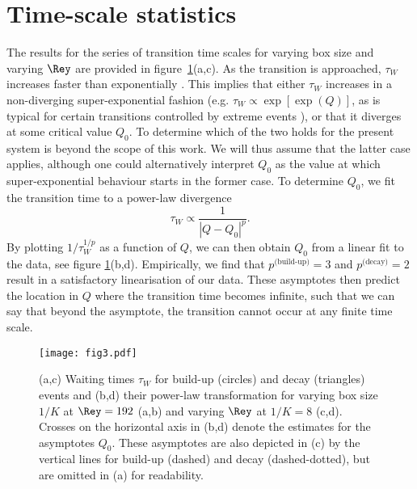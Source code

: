 \documentclass[]{jfm}
\begin{document}
\section{Time-scale statistics}\label{sec:results_discussion}     %
The results for the series of transition time scales for varying box size and varying $\Rey$ are provided in figure~\ref{fig:tauw}(a,c). As the transition is approached, $\tau_W$ increases faster than exponentially \citep[see][]{VanKan2019a}. This implies that either $\tau_W$ increases in a non-diverging super-exponential fashion (e.g. $\tau_W\propto \exp[\exp(Q)]$, as is typical for certain transitions controlled by extreme events \citep{Goldenfeld2010,Nemoto2018,Nemoto2021,Gome2021}), or that it diverges at some critical value $Q_0$. To determine which of the two holds for the present system is beyond the scope of this work. We will thus assume that the latter case applies, although one could alternatively interpret $Q_0$ as the value at which super-exponential behaviour starts in the former case. To determine $Q_0$, we fit the transition time to a power-law divergence
\begin{equation}\label{eq:asymptote}
    \tau_W\propto\frac{1}{\left|Q-Q_0\right|^p}.
\end{equation}
By plotting $1/\tau_W^{1/p}$ as a function of $Q$, we can then obtain $Q_0$ from a linear fit to the data, see figure \ref{fig:tauw}(b,d). Empirically, we find that $p^{\textrm{(build-up)}}=3$ and $p^{\textrm{(decay)}}=2$ result in a satisfactory linearisation of our data. These asymptotes then predict the location in $Q$ where the transition time becomes infinite, such that we can say that beyond the asymptote, the transition cannot occur at any finite time scale.

\begin{figure}
    \centering
    \texttt{[image: fig3.pdf]}
    \caption{(a,c) Waiting times $\tau_W$ for build-up (circles) and decay (triangles) events and (b,d) their power-law transformation for varying box size $1/K$ at $\Rey=192$ (a,b) and varying $\Rey$ at $1/K=8$ (c,d). Crosses on the horizontal axis in (b,d) denote the estimates for the asymptotes $Q_0$. These asymptotes are also depicted in (c) by the vertical lines for build-up (dashed) and decay (dashed-dotted), but are omitted in (a) for readability.}
    \label{fig:tauw}
\end{figure}
\end{document}

